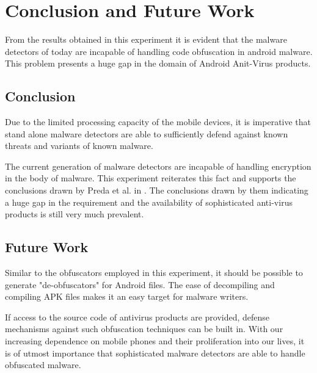 \chapter{Conclusion and Future Work}

From the results obtained in this experiment it is evident that the malware detectors of today are incapable of handling code obfuscation in android malware. This problem presents a huge gap in the domain of Android Anit-Virus products.

\section{Conclusion}

Due to the limited processing capacity of the mobile devices, it is imperative that stand alone malware detectors are able to sufficiently defend against known threats and variants of known malware. 

The current generation of malware detectors are incapable of handling encryption in the body of malware. This experiment reiterates this fact and supports the conclusions drawn by Preda et al. in \cite{aamo}. The conclusions drawn by them indicating a huge gap in the requirement and the availability of sophisticated anti-virus products is still very much prevalent.

\section{Future Work}

Similar to the obfuscators employed in this experiment, it should be possible to generate "de-obfuscators" for Android files. The ease of decompiling and compiling APK files makes it an easy target for malware writers.

If access to the source code of antivirus products are provided, defense mechanisms against such obfuscation techniques can be built in. With our increasing dependence on mobile phones and their proliferation into our lives, it is of utmost importance that sophisticated malware detectors are able to handle obfuscated malware. 

